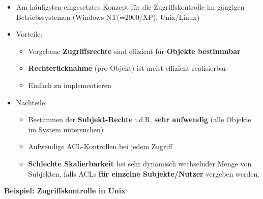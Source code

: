 \documentclass[openany]{book}
\begin{document}
\begin{itemize}
\item Am häufigsten eingesetztes Konzept für die Zugriffskontrolle im gängigen Betriebssystemen (Windows NT(=2000/XP), Unix/Linux)
\item Vorteile:
\begin{itemize}
\item Vergebene \textbf{Zugriffsrechte} sind effizient für \textbf{Objekte bestimmbar}
\item \textbf{Rechterücknahme} (pro Objekt) ist meist effizient realisierbar
\item Einfach zu implementieren
\end{itemize}
\item Nachteile:
\begin{itemize}
\item Bestimmen der \textbf{Subjekt-Rechte} i.d.R. \textbf{sehr aufwendig} (alle Objekte im System untersuchen)
\item Aufwendige ACL-Kontrollen bei jedem Zugriff
\item \textbf{Schlechte Skalierbarkeit} bei sehr dynamisch wechselnder Menge von Subjekten, falls ACLs \textbf{für einzelne Subjekte/Nutzer} vergeben werden.
\end{itemize}
\end{itemize}

\textbf{Beispiel: Zugriffskontrolle in Unix}
\end{document}
